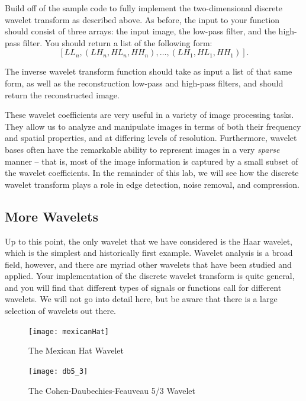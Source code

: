 \begin{problem}
Build off of the sample code to fully implement the two-dimensional discrete
wavelet transform as described above.
As before, the input to your function should consist of
three arrays: the input image, the low-pass filter, and the high-pass filter.
You should return a list of the following form: $$[LL_n,(LH_n,HL_n,HH_n), \ldots
,(LH_1,HL_1,HH_1)].$$ 

The inverse wavelet transform function should take as input a list
of that same form, as well as the reconstruction low-pass and high-pass filters,
and should return the reconstructed image.
\end{problem}

These wavelet coefficients are very useful in a variety of image processing
tasks. They allow us to analyze and manipulate images in terms of both their
frequency and spatial properties, and at differing levels of resolution.
Furthermore, wavelet bases often have the remarkable ability to represent
images in a very \textit{sparse} manner -- that is, most of the image
information is captured by a small subset of the wavelet coefficients.
In the remainder of this lab, we will see how the discrete wavelet transform
plays a role in edge detection, noise removal, and compression.

\subsection*{More Wavelets}
Up to this point, the only wavelet that we have considered is the Haar wavelet,
which is the simplest and historically first example. Wavelet analysis is a broad
field, however, and there are myriad other wavelets that have been studied and
applied. Your implementation of the discrete wavelet transform is quite general,
and you will find that different types of signals or functions call for different
wavelets. We will not go into detail here, but be aware that there is a large
selection of wavelets out there.

\begin{figure}[H]
    \texttt{[image: mexicanHat]}
    \caption{The Mexican Hat Wavelet}
\endminipage\hfill
{}
    \texttt{[image: db5\_3]}
    \caption{The Cohen-Daubechies-Feauveau 5/3 Wavelet}
\endminipage
\end{figure}

